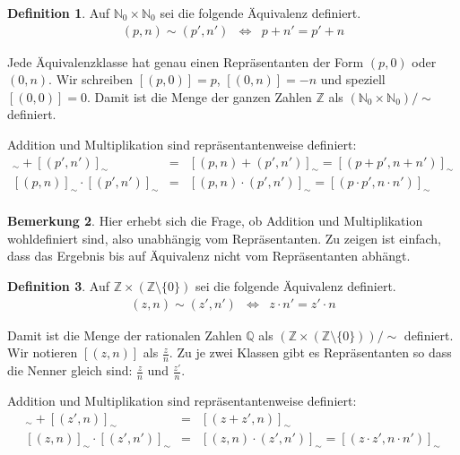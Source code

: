 \documentclass[index=totoc]{scrartcl}%
\theoremstyle{definition}
\newtheorem{defi}{Definition}[section]
\newtheorem{bem}[defi]{Bemerkung}
\newcommand{\N}{\mathbb N}
\newcommand{\Z}{\mathbb Z}
\newcommand{\Q}{\mathbb Q}
\begin{document}
\begin{defi}
  Auf $\N_0\times\N_0$ sei die folgende Äquivalenz definiert. 
  \begin{eqnarray*}
    (p,n)\sim(p',n') & \iff & p+n' = p'+n
  \end{eqnarray*}

  Jede Äquivalenzklasse hat genau einen Repräsentanten
  der Form $(p,0)$ oder $(0,n)$.
  Wir schreiben $[(p,0)]=p$, $[(0,n)]=-n$ und speziell $[(0,0)]=0$. 
  Damit ist die Menge der ganzen Zahlen $\Z$ als $(\N_0\times\N_0)/\sim$
  definiert.

  Addition und Multiplikation sind repräsentantenweise definiert:
  \begin{eqnarray*}
    [(p,n)]_\sim+    [(p',n')]_\sim
    & = &
          [(p,n)+(p',n')]_\sim= [(p+p',n+n')]_\sim\\{}
    [(p,n)]_\sim\cdot[(p',n')]_\sim
    & = &
          [(p,n)\cdot(p',n')]_\sim= [(p\cdot p',n\cdot n')]_\sim\\
  \end{eqnarray*}
\end{defi}

\begin{bem}
  Hier erhebt sich die Frage, ob Addition und Multiplikation wohldefiniert sind,
  also unabhängig vom Repräsentanten.
  Zu zeigen ist einfach, dass das Ergebnis bis auf Äquivalenz
  nicht vom Repräsentanten abhängt. 
\end{bem}

\begin{defi}
  Auf $\Z\times(\Z\setminus\{0\})$ sei die folgende Äquivalenz definiert. 
  \begin{eqnarray*}
    (z,n)\sim(z',n') & \iff & z\cdot n' = z'\cdot n
  \end{eqnarray*}

  Damit ist die Menge der rationalen Zahlen $\Q$ als
  $(\Z\times(\Z\setminus\{0\}))/\sim$ definiert.
  Wir notieren $[(z,n)]$ als $\frac zn$. 
  Zu je zwei Klassen gibt es Repräsentanten so dass die Nenner gleich sind:
  $\frac zn$ und  $\frac{z'}n$. 

  Addition und Multiplikation sind repräsentantenweise definiert:
  \begin{eqnarray*}
    [(z,n)]_\sim+    [(z',n)]_\sim
    & = &
          [(z+z',n)]_\sim\\{}
    [(z,n)]_\sim\cdot[(z',n')]_\sim
    & = &
          [(z,n)\cdot(z',n')]_\sim= [(z\cdot z',n\cdot n')]_\sim\\
  \end{eqnarray*}
\end{defi}
\end{document}
